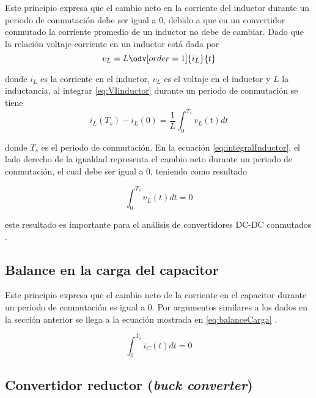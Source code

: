  Este principio expresa que el cambio neto en la corriente del inductor
durante un periodo de conmutación debe ser igual a 0, debido a que en un convertidor conmutado
la corriente promedio de un inductor no debe de cambiar. Dado que la relación voltaje-corriente en un  inductor está dada por
\begin{equation}
    v_L = L \odv[order=1]{i_L}{t}
    \label{eq:VIinductor}
\end{equation}

donde $i_L$ es la corriente en el inductor, $v_L$ es el voltaje en el inductor
y $L$ la inductancia, al integrar \ref{eq:VIinductor} durante un periodo de conmutación
se tiene 
\begin{equation}
i_L\left(T_s\right)-i_L(0)=\frac{1}{L} \int_0^{T_s} v_L(t) d t
\label{eq:integralInductor}
\end{equation}

donde $T_s$ es el periodo de conmutación. En la ecuación \ref{eq:integralInductor}, el lado
derecho de la igualdad representa el cambio neto durante un periodo de conmutación, el cual 
debe ser igual a 0, teniendo como resultado

\begin{equation}
    \int_0^{T_s} v_L(t) d t = 0
\end{equation}

este resultado es importante para el análisis de convertidores DC-DC conmutados \cite{erickson_fundamentals_2020}.

\subsection{Balance en la carga del capacitor}

Este principio expresa que el cambio neto de la corriente en el capacitor durante un periodo 
de conmutación es igual a 0. Por argumentos similares a los dados en la sección anterior se 
llega a la ecuación mostrada en \ref{eq:balanceCarga} \cite{erickson_fundamentals_2020}.

\begin{equation}
    \int_0^{T_s} i_C(t) d t = 0
    \label{eq:balanceCarga}
\end{equation}

\subsection{Convertidor reductor (\textit{buck converter})}

